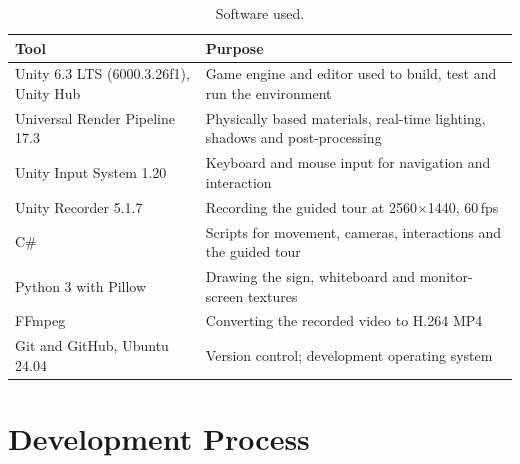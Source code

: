 \documentclass[11pt,a4paper]{article}
\begin{document}
\begin{table}[h]
\centering\small
\begin{tabularx}{\textwidth}{@{}p{6.2cm}L@{}}
\toprule
\textbf{Tool} & \textbf{Purpose} \\
\midrule
Unity 6.3 LTS (6000.3.26f1), Unity Hub & Game engine and editor used to build, test and run the environment \\
Universal Render Pipeline 17.3 & Physically based materials, real-time lighting, shadows and post-processing \\
Unity Input System 1.20 & Keyboard and mouse input for navigation and interaction \\
Unity Recorder 5.1.7 & Recording the guided tour at 2560$\times$1440, 60\,fps \\
C\# & Scripts for movement, cameras, interactions and the guided tour \\
Python 3 with Pillow & Drawing the sign, whiteboard and monitor-screen textures \\
FFmpeg & Converting the recorded video to H.264 MP4 \\
Git and GitHub, Ubuntu 24.04 & Version control; development operating system \\
\bottomrule
\end{tabularx}
\caption{Software used.}
\end{table}

\section{Development Process}
\end{document}
